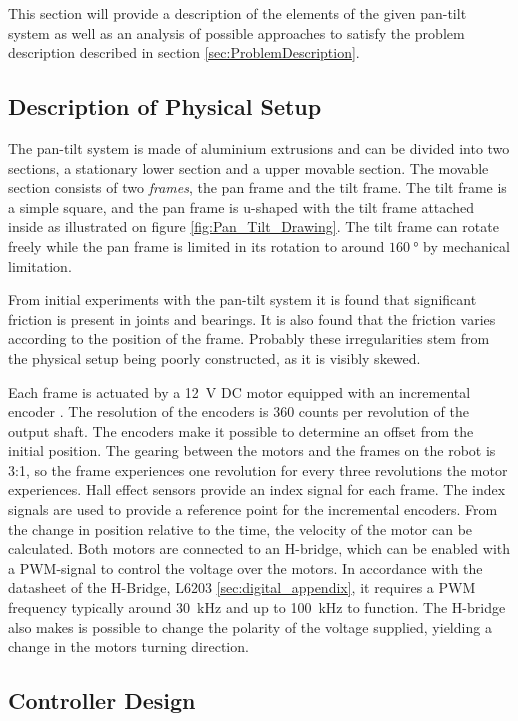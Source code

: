 \documentclass[../../main.tex]{subfiles}
\begin{document}
This section will provide a description of the elements of the given pan-tilt system as well as an analysis of possible approaches to satisfy the problem description described in section \ref{sec:ProblemDescription}.

\subsection{Description of Physical Setup}
The pan-tilt system is made of aluminium extrusions and can be divided into two sections, a stationary lower section and a upper movable section. The movable section consists of two \textit{frames}, the pan frame and the tilt frame. The tilt frame is a simple square, and the pan frame is u-shaped with the tilt frame attached inside as illustrated on figure \ref{fig:Pan_Tilt_Drawing}. The tilt frame can rotate freely while the pan frame is limited in its rotation to around $\SI{160}{\degree}$ by mechanical limitation.

From initial experiments with the pan-tilt system it is found that significant friction is present in joints and bearings. It is also found that the friction varies according to the position of the frame. Probably these irregularities stem from the physical setup being poorly constructed, as it is visibly skewed.  

Each frame is actuated by a \SI{12}{\volt} DC motor equipped with an incremental encoder \cite{}. The resolution of the encoders is 360 counts per revolution of the output shaft. The encoders make it possible to determine an offset from the initial position. The gearing between the motors and the frames on the robot is 3:1, so the frame experiences one revolution for every three revolutions the motor experiences. Hall effect sensors \cite{} provide an index signal for each frame. The index signals are used to provide a reference point for the incremental encoders. From the change in position relative to the time, the velocity of the motor can be calculated. Both motors are connected to an H-bridge, which can be enabled with a PWM-signal to control the voltage over the motors. In accordance with the datasheet of the H-Bridge, L6203 \cite{} \ref{sec:digital_appendix}, it requires a PWM frequency typically around \SI{30}{\kilo\hertz} and up to \SI{100}{\kilo\hertz} to function. The H-bridge also makes is possible to change the polarity of the voltage supplied, yielding a change in the motors turning direction.

\subsection{Controller Design}
\end{document}
